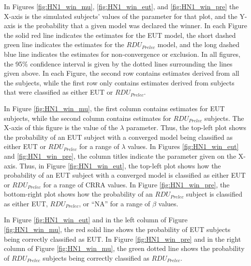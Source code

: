 \documentclass[../main.tex]{subfiles}
\begin{document}
In Figures \ref{fig:HN1_win_mu}, \ref{fig:HN1_win_eut}, and \ref{fig:HN1_win_pre} the X-axis is the simulated subjects' values of the parameter for that plot, and the Y-axis is the probability that a given model was declared the winner.
In each Figure the solid red line indicates the estimates for the EUT model, the short dashed green line indicates the estimates for the $\mathit{RDU_{Prelec}}$ model, and the long dashed blue line indicates the estimates for non-convergence or exclusion.
In all figures, the 95\% confidence interval is given by the dotted lines surrounding the lines given above.
In each Figure, the second row contains estimates derived from all the subjects, while the first row only contains estimates derived from subjects that were classified as either EUT or $\mathit{RDU_{Prelec}}$.

In Figure \ref{fig:HN1_win_mu}, the first column contains estimates for EUT subjects, while the second column contains estimates for $\mathit{RDU_{Prelec}}$ subjects.
The X-axis of this figure is the value of the $\lambda$ parameter.
Thus, the top-left plot shows the probability of an EUT subject with a converged model being classified as either EUT or $\mathit{RDU_{Prelec}}$ for a range of $\lambda$ values.
In Figures \ref{fig:HN1_win_eut} and \ref{fig:HN1_win_pre}, the column titles indicate the parameter given on the X-axis.
Thus, in Figure \ref{fig:HN1_win_eut}, the top-left plot shows how the probability of an EUT subject with a converged model is classified as either EUT or $\mathit{RDU_{Prelec}}$ for a range of CRRA values.
In Figure \ref{fig:HN1_win_pre}, the bottom-right plot shows how the probability of an $\mathit{RDU_{Prelec}}$ subject is classified as either EUT, $\mathit{RDU_{Prelec}}$, or \enquote{NA} for a range of $\beta$ values.

In Figure \ref{fig:HN1_win_eut} and in the left column of Figure \ref{fig:HN1_win_mu}, the red solid line shows the probability of EUT subjects being correctly classified as EUT.
In Figure \ref{fig:HN1_win_pre} and in the right column of Figure \ref{fig:HN1_win_mu}, the green dotted line shows the probability of $\mathit{RDU_{Prelec}}$ subjects being correctly classified as $\mathit{RDU_{Prelec}}$.
\end{document}
